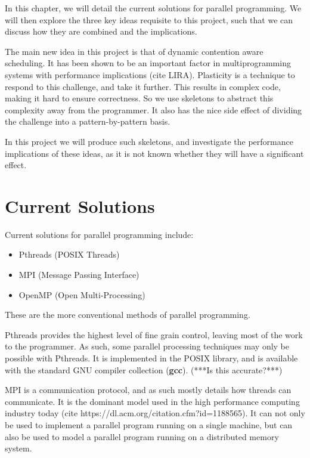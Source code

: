 
In this chapter, we will detail the current solutions for parallel programming. We will then explore the three key ideas requisite to this project, such that we can discuss how they are combined and the implications.

The main new idea in this project is that of dynamic contention aware scheduling. It has been shown to be an important factor in multiprogramming systems with performance implications (cite LIRA). Plasticity is a technique to respond to this challenge, and take it further. This results in complex code, making it hard to ensure correctness. So we use skeletons to abstract this complexity away from the programmer. It also has the nice side effect of dividing the challenge into a pattern-by-pattern basis.

In this project we will produce such skeletons, and investigate the performance implications of these ideas, as it is not known whether they will have a significant effect.



\section{Current Solutions}

Current solutions for parallel programming include:

\begin{itemize}
	\item Pthreads (POSIX Threads)
	\item MPI 	   (Message Passing Interface)
	\item OpenMP   (Open Multi-Processing)
\end{itemize}

These are the more conventional methods of parallel programming.

Pthreads provides the highest level of fine grain control, leaving most of the work to the programmer. As such, some parallel processing techniques may only be possible with Pthreads. It is implemented in the POSIX library, and is available with the standard GNU compiler collection (\textbf{gcc}). (***Is this accurate?***)

MPI is a communication protocol, and as such mostly details how threads can communicate. It is the dominant model used in the high performance computing industry today (cite https://dl.acm.org/citation.cfm?id=1188565). It can not only be used to implement a parallel program running on a single machine, but can also be used to model a parallel program running on a distributed memory system.

